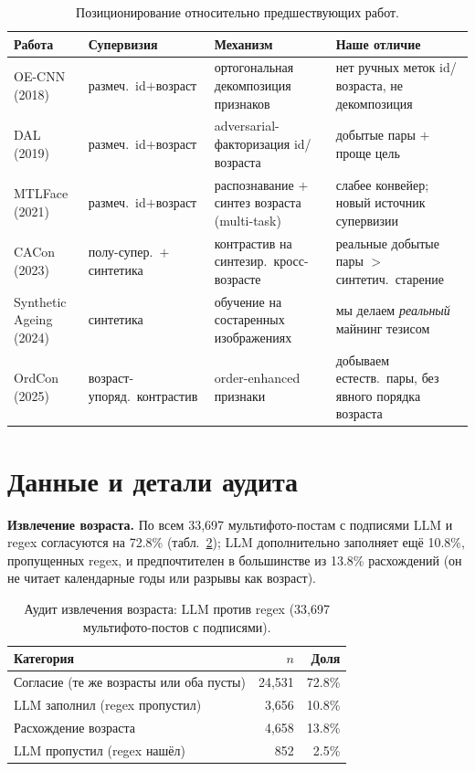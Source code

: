 \documentclass[10pt,twocolumn,letterpaper]{article}
\begin{document}
\begin{table}[t]
\centering
\small
\begin{tabular}{@{}p{}p{}p{}p{}@{}}
\toprule
Работа & Супервизия & Механизм & Наше отличие \\
\midrule
OE-CNN (2018)~\cite{wang2018oecnn} & размеч.\ id$+$возраст & ортогональная декомпозиция признаков & нет ручных меток id/возраста, не декомпозиция \\
DAL (2019)~\cite{wang2019dal} & размеч.\ id$+$возраст & adversarial-факторизация id/возраста & добытые пары $+$ проще цель \\
MTLFace (2021)~\cite{huang2021mtlface} & размеч.\ id$+$возраст & распознавание $+$ синтез возраста (multi-task) & слабее конвейер; новый источник супервизии \\
CACon (2023)~\cite{wang2024cacon} & полу-супер.\ $+$ синтетика & контрастив на синтезир.\ кросс-возрасте & реальные добытые пары $>$ синтетич.\ старение \\
Synthetic Ageing (2024)~\cite{yao2024synthageing} & синтетика & обучение на состаренных изображениях & мы делаем \emph{реальный} майнинг тезисом \\
OrdCon (2025)~\cite{wang2025ordcon} & возраст-упоряд.\ контрастив & order-enhanced признаки & добываем естеств.\ пары, без явного порядка возраста \\
\bottomrule
\end{tabular}
\caption{Позиционирование относительно предшествующих работ.}
\label{tab:positioning}
\end{table}

\section{Данные и детали аудита}\label{sup:audit}
\textbf{Извлечение возраста.} По всем 33{,}697 мультифото-постам с подписями LLM и regex согласуются на
72.8\% (табл.~\ref{tab:age}); LLM дополнительно заполняет ещё 10.8\%, пропущенных regex, и предпочтителен
в большинстве из 13.8\% расхождений (он не читает календарные годы или разрывы как возраст).

\begin{table}[t]
\centering
\small
\begin{tabular}{@{}lrr@{}}
\toprule
Категория & $n$ & Доля \\
\midrule
Согласие (те же возрасты или оба пусты) & 24{,}531 & 72.8\% \\
LLM заполнил (regex пропустил) & 3{,}656 & 10.8\% \\
Расхождение возраста & 4{,}658 & 13.8\% \\
LLM пропустил (regex нашёл) & 852 & 2.5\% \\
\bottomrule
\end{tabular}
\caption{Аудит извлечения возраста: LLM против regex (33{,}697 мультифото-постов с подписями).}
\label{tab:age}
\end{table}
\end{document}
